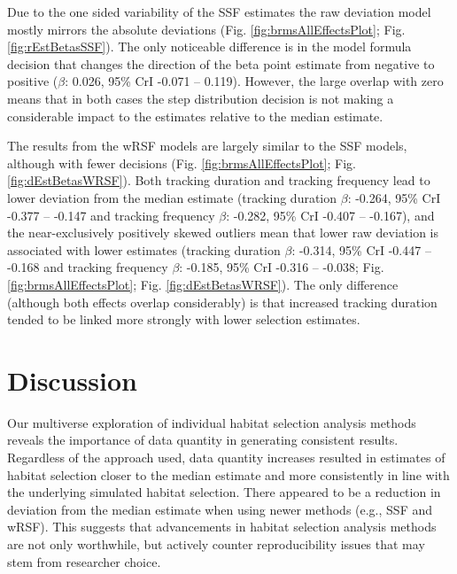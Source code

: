 \documentclass[10pt,a4paper]{article}
\begin{document}
Due to the one sided variability of the SSF estimates the raw deviation model mostly mirrors the absolute deviations (Fig. \ref{fig:brmsAllEffectsPlot}; Fig. \ref{fig:rEstBetasSSF}).
The only noticeable difference is in the model formula decision that changes the direction of the beta point estimate from negative to positive (\(\beta\): 0.026, 95\% CrI -0.071 -- 0.119).
However, the large overlap with zero means that in both cases the step distribution decision is not making a considerable impact to the estimates relative to the median estimate.

The results from the wRSF models are largely similar to the SSF models, although with fewer decisions (Fig. \ref{fig:brmsAllEffectsPlot}; Fig. \ref{fig:dEstBetasWRSF}).
Both tracking duration and tracking frequency lead to lower deviation from the median estimate (tracking duration \(\beta\): -0.264, 95\% CrI -0.377 -- -0.147 and tracking frequency \(\beta\): -0.282, 95\% CrI -0.407 -- -0.167), and the near-exclusively positively skewed outliers mean that lower raw deviation is associated with lower estimates (tracking duration \(\beta\): -0.314, 95\% CrI -0.447 -- -0.168 and tracking frequency \(\beta\): -0.185, 95\% CrI -0.316 -- -0.038; Fig. \ref{fig:brmsAllEffectsPlot}; Fig. \ref{fig:dEstBetasWRSF}).
The only difference (although both effects overlap considerably) is that increased tracking duration tended to be linked more strongly with lower selection estimates.

\section{Discussion}\label{discussion}

Our multiverse exploration of individual habitat selection analysis methods reveals the importance of data quantity in generating consistent results.
Regardless of the approach used, data quantity increases resulted in estimates of habitat selection closer to the median estimate and more consistently in line with the underlying simulated habitat selection.
There appeared to be a reduction in deviation from the median estimate when using newer methods (e.g., SSF and wRSF).
This suggests that advancements in habitat selection analysis methods are not only worthwhile, but actively counter reproducibility issues that may stem from researcher choice.
\end{document}
